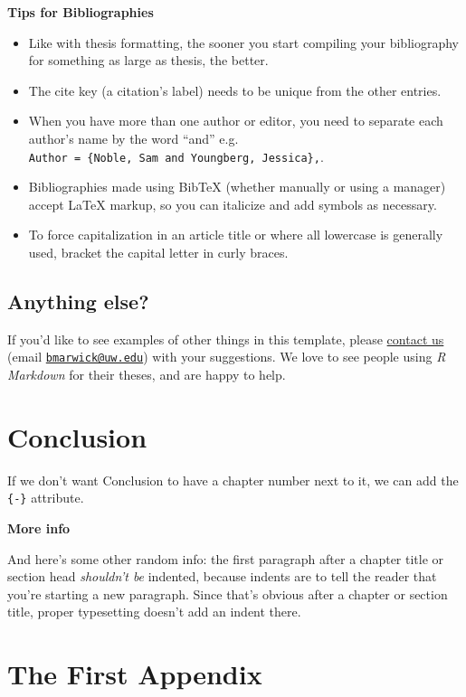 \documentclass [11pt, proquest] {uwthesis}[2015/03/03]
\providecommand{\tightlist}{%
  \setlength{\itemsep}{0pt}\setlength{\parskip}{0pt}}
\begin{document}
\textbf{Tips for Bibliographies}
\begin{itemize}
\tightlist
\item
  Like with thesis formatting, the sooner you start compiling your
  bibliography for something as large as thesis, the better.
\item
  The cite key (a citation's label) needs to be unique from the other
  entries.
\item
  When you have more than one author or editor, you need to separate
  each author's name by the word ``and'' e.g.
  \texttt{Author\ =\ \{Noble,\ Sam\ and\ Youngberg,\ Jessica\},}.
\item
  Bibliographies made using BibTeX (whether manually or using a manager)
  accept LaTeX markup, so you can italicize and add symbols as
  necessary.
\item
  To force capitalization in an article title or where all lowercase is
  generally used, bracket the capital letter in curly braces.
\end{itemize}
\section{Anything else?}\label{anything-else}

If you'd like to see examples of other things in this template, please
\href{https://github.com/benmarwick/huskydown/issues/new}{contact us}
(email \href{mailto:bmarwick@uw.edu}{\nolinkurl{bmarwick@uw.edu}}) with
your suggestions. We love to see people using \emph{R Markdown} for
their theses, and are happy to help.

\chapter*{Conclusion}\label{conclusion}

If we don't want Conclusion to have a chapter number next to it, we can
add the \texttt{\{-\}} attribute.

\textbf{More info}

And here's some other random info: the first paragraph after a chapter
title or section head \emph{shouldn't be} indented, because indents are
to tell the reader that you're starting a new paragraph. Since that's
obvious after a chapter or section title, proper typesetting doesn't add
an indent there.

\appendix

\chapter{The First Appendix}\label{the-first-appendix}
\end{document}
